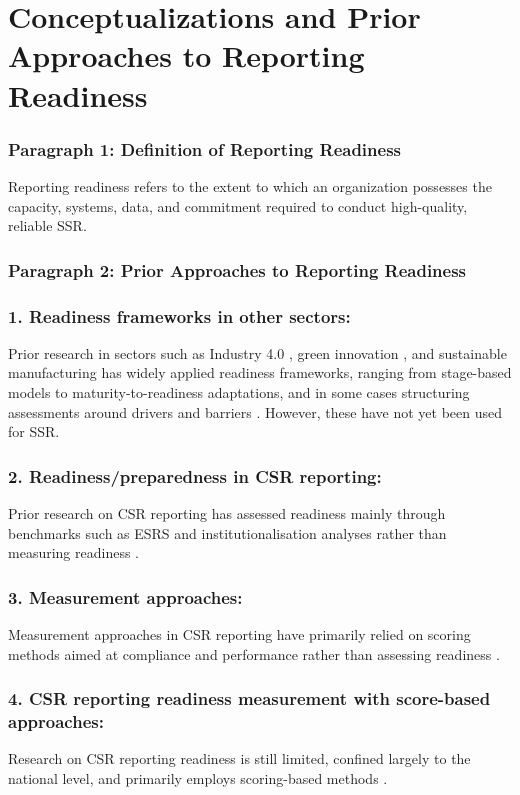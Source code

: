 \section{Conceptualizations and Prior Approaches to Reporting Readiness}

\subsubsection{Paragraph 1: Definition of Reporting Readiness}
Reporting readiness refers to the extent to which an organization possesses the capacity, systems, data,
and commitment required to conduct high-quality, reliable SSR.

\subsubsection{Paragraph 2: Prior Approaches to Reporting Readiness}

\subsubsection{1. Readiness frameworks in other sectors:}
Prior research in sectors such as Industry 4.0 \parencite{ElBaz2022}, 
green innovation \parencite{Zhang2020},
and sustainable manufacturing \parencite{Barletta2021} has widely applied readiness frameworks,
ranging from stage-based models to maturity-to-readiness adaptations, 
and in some cases structuring assessments around drivers and barriers \parencite{Govindan2023}.
However, these have not yet been used for SSR.

\subsubsection{2. Readiness/preparedness in CSR reporting:}
Prior research on CSR reporting has assessed readiness mainly through benchmarks 
such as ESRS and institutionalisation analyses rather than measuring readiness 
\parencite{Filho2025,Shabana2017}. 

\subsubsection{3. Measurement approaches:}
Measurement approaches in CSR reporting have primarily relied on scoring methods
aimed at compliance and performance rather than assessing readiness
\parencite{Tobias2022,Papoutsi2020,Gai2023,Nicolo2025}.

\subsubsection{4. CSR reporting readiness measurement with score-based approaches:}
Research on CSR reporting readiness is still limited, confined largely to the national level, 
and primarily employs scoring-based methods
\parencite{Nguyen2024,Montero2025}.

